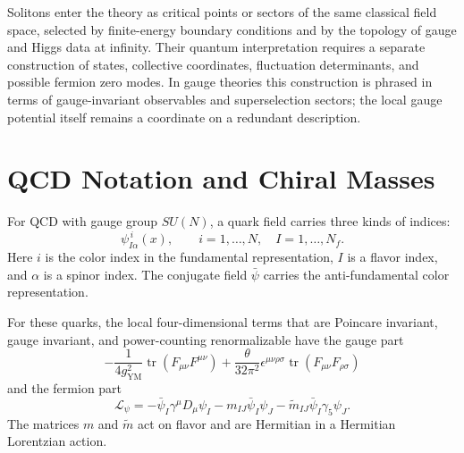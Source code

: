 Solitons enter the theory as critical points or sectors of the same classical
field space, selected by finite-energy boundary conditions and by the topology
of gauge and Higgs data at infinity.  Their quantum interpretation requires a
separate construction of states, collective coordinates, fluctuation
determinants, and possible fermion zero modes.  In gauge theories this
construction is phrased in terms of gauge-invariant observables and
superselection sectors; the local gauge potential itself remains a coordinate
on a redundant description.

\section{QCD Notation and Chiral Masses}

For QCD with gauge group \(SU(N)\), a quark field carries three kinds of
indices:
\[
  \psi^{\,i}_{I\alpha}(x),
  \qquad
  i=1,\ldots,N,\quad
  I=1,\ldots,N_f .
\]
Here \(i\) is the color index in the fundamental representation, \(I\) is a
flavor index, and \(\alpha\) is a spinor index.  The conjugate field
\(\bar\psi\) carries the anti-fundamental color representation.

For these quarks, the local four-dimensional terms that are Poincare
invariant, gauge invariant, and power-counting renormalizable have the gauge
part
\[
  -\frac1{4g_{\mathrm{YM}}^2}\operatorname{tr}(F_{\mu\nu}F^{\mu\nu})
  +
  \frac{\theta}{32\pi^2}
  \epsilon^{\mu\nu\rho\sigma}
  \operatorname{tr}(F_{\mu\nu}F_{\rho\sigma})
\]
and the fermion part
\begin{equation}
  \mathcal L_\psi
  =
  -\bar\psi_I\gamma^\mu D_\mu\psi_I
  -
  m_{IJ}\bar\psi_I\psi_J
  -
  \widetilde m_{IJ}\bar\psi_I\gamma_5\psi_J .
  \label{eq:qcd-fermion-mass-lagrangian}
\end{equation}
The matrices \(m\) and \(\widetilde m\) act on flavor and are Hermitian in a
Hermitian Lorentzian action.

